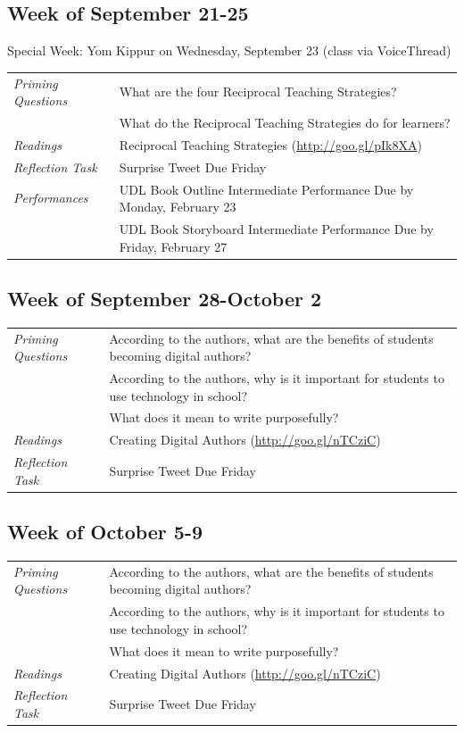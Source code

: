 \documentclass{tufte-handout}
\newcommand{\tabpq}{\faQuestionSign\medspace\textit{Priming Questions}}
\newcommand{\tabread}{\faBook\medspace\textit{Readings}}
\newcommand{\tabtweet}{\faLightbulb\medspace\textit{Reflection Task} & Surprise Tweet Due Friday \\}
\newcommand{\tabperformance}{\faTasks\medspace\textit{Performances}}
\newenvironment{tabsched}
	{\small
	\begin{tabular}{p{1.5in}p{4.5in}}
	\toprule}
	{\bottomrule
	\end{tabular}
	\normalsize}
\newenvironment{specweek}
	{\begin{center}
		\fontseries{b} \faBullhorn \medspace Special Week: }
		{\medspace \faBullhorn \fontseries{m}
	\end{center}}
\newcommand{\weeksix}{September 21-25}
\newcommand{\weekseven}{September 28-October 2}
\newcommand{\weekeight}{October 5-9}
\newcommand{\yomkippur}{Yom Kippur on Wednesday, September 23 (class via VoiceThread)}
\begin{document}
\subsection{Week of \weeksix}

\begin{specweek}\yomkippur\end{specweek}

\begin{tabsched}
	\tabpq & What are the four Reciprocal Teaching Strategies? \\
	& What do the Reciprocal Teaching Strategies do for learners? \\
	\midrule
	\tabread & Reciprocal Teaching Strategies (\url{http://goo.gl/pIk8XA}) \\
	\midrule
	\tabtweet
	\midrule
	\tabperformance & UDL Book Outline Intermediate Performance Due by Monday, February 23 \\
	& UDL Book Storyboard Intermediate Performance Due by Friday, February 27 \\

\end{tabsched}

\subsection{Week of \weekseven}

\begin{tabsched}
	\tabpq & According to the authors, what are the benefits of students becoming digital authors? \\
	& According to the authors, why is it important for students to use technology in school? \\
	& What does it mean to write purposefully? \\
	\midrule
	\tabread & Creating Digital Authors (\url{http://goo.gl/nTCziC}) \\
	\midrule
	\tabtweet
\end{tabsched}

\subsection{Week of \weekeight}

\begin{tabsched}
	\tabpq & According to the authors, what are the benefits of students becoming digital authors? \\
	& According to the authors, why is it important for students to use technology in school? \\
	& What does it mean to write purposefully? \\
	\midrule
	\tabread & Creating Digital Authors (\url{http://goo.gl/nTCziC}) \\
	\midrule
	\tabtweet
\end{tabsched}
\end{document}
